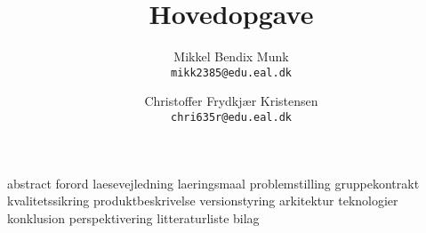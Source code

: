 \documentclass[a4paper, 11pt, danish]{report}
\title{Hovedopgave}
\author{
    Mikkel Bendix Munk\\
    \texttt{mikk2385@edu.eal.dk}
    \and
    Christoffer Frydkjær Kristensen\\
    \texttt{chri635r@edu.eal.dk}
}
\begin{document}
\maketitle
\tableofcontents{}
\newpage
{abstract}
{forord}
{laesevejledning}
{laeringsmaal}
{problemstilling}
{gruppekontrakt}
{kvalitetssikring}
{produktbeskrivelse}
{versionstyring}
{arkitektur}
{teknologier}
{konklusion}
{perspektivering}
{litteraturliste}
{bilag}
\end{document}
